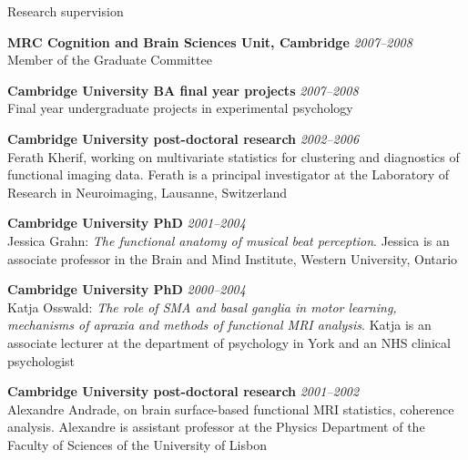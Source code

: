 \documentclass{cv}
\newcommand{\PlaceDateNote}[3]{{\bf #1} \hfill {\em #2} \\#3}
\newcommand{\CBU}{MRC Cognition and Brain Sciences Unit, Cambridge}
\begin{document}
\begin{cvSection}{Research supervision}

\PlaceDateNote{\CBU}{2007--2008}
{Member of the Graduate Committee}

\PlaceDateNote{Cambridge University BA final year projects}{2007--2008}
{Final year undergraduate projects in experimental psychology}

\PlaceDateNote{Cambridge University post-doctoral research}{2002--2006}
{Ferath Kherif, working on multivariate statistics for clustering and
diagnostics of functional imaging data. Ferath is a principal investigator at
the Laboratory of Research in Neuroimaging, Lausanne, Switzerland}

\PlaceDateNote{Cambridge University PhD}{2001--2004}
{Jessica Grahn: {\em The functional anatomy of musical beat perception}.
Jessica is an associate professor in the Brain and Mind Institute, Western
University, Ontario}

\PlaceDateNote{Cambridge University PhD}{2000--2004}
{Katja Osswald: {\em The role of SMA and basal ganglia in motor learning,
mechanisms of apraxia and methods of functional MRI analysis}. Katja is an
associate lecturer at the department of psychology in York and an NHS clinical
psychologist}

\PlaceDateNote{Cambridge University post-doctoral research}{2001--2002}
{Alexandre Andrade, on brain surface-based functional MRI statistics, coherence
analysis.  Alexandre is assistant professor at the Physics Department of the
Faculty of Sciences of the University of Lisbon}

\end{cvSection}
\end{document}
